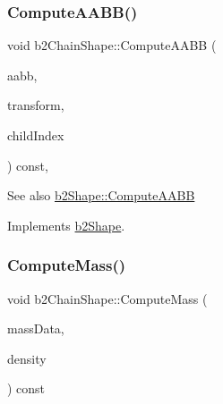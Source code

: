 \mbox{\label{classb2ChainShape_ae1d7470ce8d32e92d27c149ab45f5468}} 
\subsubsection{\texorpdfstring{Compute\+A\+A\+B\+B()}{ComputeAABB()}\hspace{0.1cm}{\footnotesize\ttfamily [2/2]}}
{\footnotesize\ttfamily void b2\+Chain\+Shape\+::\+Compute\+A\+A\+BB (\begin{DoxyParamCaption}\item[{\hyperlink{structb2AABB}{b2\+A\+A\+BB} $\ast$}]{aabb,  }\item[{const \hyperlink{structb2Transform}{b2\+Transform} \&}]{transform,  }\item[{int32}]{child\+Index }\end{DoxyParamCaption}) const\hspace{0.3cm}{\ttfamily [override]}, {\ttfamily [virtual]}}

\begin{DoxySeeAlso}{See also}
\hyperlink{classb2Shape_a88e9807fab0c8ca9a98d8926e50a1411}{b2\+Shape\+::\+Compute\+A\+A\+BB} 
\end{DoxySeeAlso}


Implements \hyperlink{classb2Shape_a88e9807fab0c8ca9a98d8926e50a1411}{b2\+Shape}.

\mbox{\label{classb2ChainShape_a55efeb6d4005c1ca4b01cbcc5d7369db}} 
\subsubsection{\texorpdfstring{Compute\+Mass()}{ComputeMass()}\hspace{0.1cm}{\footnotesize\ttfamily [1/2]}}
{\footnotesize\ttfamily void b2\+Chain\+Shape\+::\+Compute\+Mass (\begin{DoxyParamCaption}\item[{\hyperlink{structb2MassData}{b2\+Mass\+Data} $\ast$}]{mass\+Data,  }\item[{float32}]{density }\end{DoxyParamCaption}) const\hspace{0.3cm}{\ttfamily [virtual]}}


